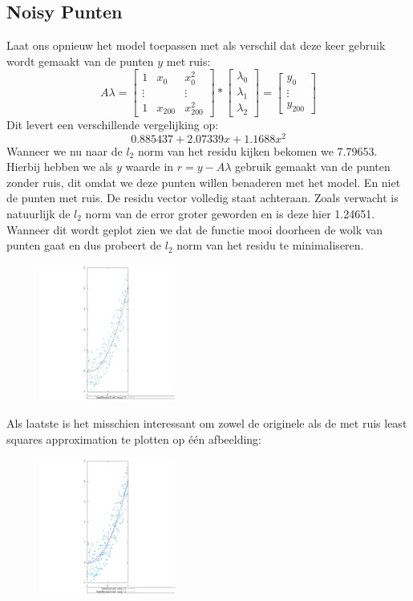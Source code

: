 \documentclass[10pt,a4paper,twocolumn]{article}
\begin{document}
\subsection{Noisy Punten}
Laat ons opnieuw het model toepassen met als verschil dat deze keer gebruik wordt gemaakt van de punten $y$ met ruis:
$$
A \lambda = \begin{bmatrix}
1 & x_{0} & x^{2}_{0} \\ 
\vdots &  & \vdots\\ 
1 & x_{200} & x^{2}_{200}
\end{bmatrix}
* \begin{bmatrix}
\lambda_{0} \\
\lambda_{1}  \\
\lambda_{2} 
\end{bmatrix}
= \begin{bmatrix}
y_{0} \\
\vdots  \\
y_{200}
\end{bmatrix}
$$
Dit levert een verschillende vergelijking op:
$$0.885437 + 2.07339x + 1.1688x^{2}$$
Wanneer we nu naar de $l_{2}$ norm van het residu kijken bekomen we 7.79653. Hierbij hebben we als $y$ waarde in $r = y - A\lambda$ gebruik gemaakt van de punten zonder ruis, dit omdat we deze punten willen benaderen met het model. En niet de punten met ruis. De residu vector volledig staat achteraan. Zoals verwacht is natuurlijk de $l_{2}$ norm van de error groter geworden en is deze hier 1.24651. Wanneer dit wordt geplot zien we dat de functie mooi doorheen de wolk van punten gaat en dus probeert de $l_{2}$ norm van het residu te minimaliseren.
\begin{figure}[H]
\includegraphics[width=0.4\textwidth]{MnoisyLS}
\end{figure}
Als laatste is het misschien interessant om zowel de originele als de met ruis least squares approximation te plotten op één afbeelding:
\begin{figure}[H]
\includegraphics[width=0.4\textwidth]{monomialsCombinedLS}
\end{figure}
\end{document}
